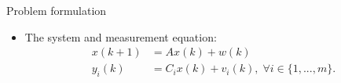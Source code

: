\documentclass[10pt]{beamer}
\DeclareMathOperator{\1}{\textbf{1}}
\begin{document}


\begin{frame}{Problem formulation}
	\begin{itemize}
		\item The system and measurement equation:
		\begin{align*}
		x(k+1)&=Ax(k)+w(k)\\
		y_i(k)&=C_ix(k)+v_i(k), \;\forall i\in\{1,...,m\}.
		\end{align*}
	\end{itemize}
\end{frame}
\end{document}
